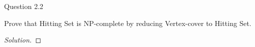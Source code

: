 \begin{solution}{Question 2.2}\label{ques:22}
    \begin{question}
    Prove that Hitting Set is NP-complete by reducing Vertex-cover to Hitting Set.
    \end{question}
    \tcblower{}
    \begin{proof}[Solution]
    
    \end{proof}
\end{solution}
